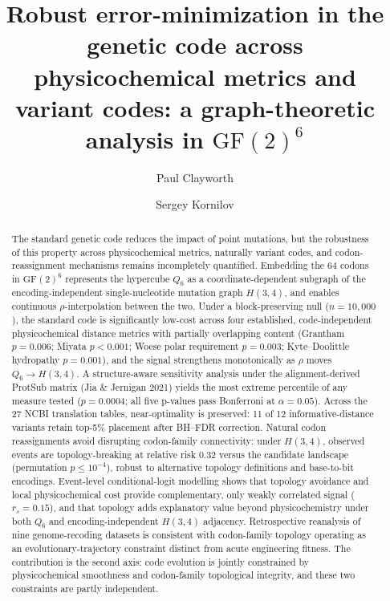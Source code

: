 \documentclass[preprint,11pt,authoryear,a4paper]{elsarticle}
\begin{document}
\begin{frontmatter}

\title{Robust error-minimization in the genetic code across physicochemical metrics and variant codes: a graph-theoretic analysis in $\mathrm{GF}(2)^6$}

\author[lc]{Paul Clayworth}
\author[bs]{Sergey Kornilov}



\begin{abstract}
The standard genetic code reduces the impact of point mutations, but the robustness of this property across physicochemical metrics, naturally variant codes, and codon-reassignment mechanisms remains incompletely quantified. Embedding the 64 codons in $\mathrm{GF}(2)^6$ represents the hypercube $Q_6$ as a coordinate-dependent subgraph of the encoding-independent single-nucleotide mutation graph $H(3,4)$, and enables continuous $\rho$-interpolation between the two. Under a block-preserving null ($n = 10{,}000$), the standard code is significantly low-cost across four established, code-independent physicochemical distance metrics with partially overlapping content (Grantham $p = 0.006$; Miyata $p < 0.001$; Woese polar requirement $p = 0.003$; Kyte--Doolittle hydropathy $p = 0.001$), and the signal strengthens monotonically as $\rho$ moves $Q_6 \to H(3,4)$. A structure-aware sensitivity analysis under the alignment-derived ProtSub matrix (Jia \& Jernigan 2021) yields the most extreme percentile of any measure tested ($p = 0.0004$; all five p-values pass Bonferroni at $\alpha = 0.05$). Across the 27 NCBI translation tables, near-optimality is preserved: 11 of 12 informative-distance variants retain top-5\% placement after BH--FDR correction. Natural codon reassignments avoid disrupting codon-family connectivity: under $H(3,4)$, observed events are topology-breaking at relative risk $0.32$ versus the candidate landscape (permutation $p \leq 10^{-4}$), robust to alternative topology definitions and base-to-bit encodings. Event-level conditional-logit modelling shows that topology avoidance and local physicochemical cost provide complementary, only weakly correlated signal ($r_s = 0.15$), and that topology adds explanatory value beyond physicochemistry under both $Q_6$ and encoding-independent $H(3,4)$ adjacency. Retrospective reanalysis of nine genome-recoding datasets is consistent with codon-family topology operating as an evolutionary-trajectory constraint distinct from acute engineering fitness. The contribution is the second axis: code evolution is jointly constrained by physicochemical smoothness and codon-family topological integrity, and these two constraints are partly independent.
\end{abstract}


\end{frontmatter}
\end{document}
